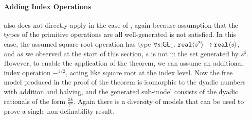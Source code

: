 \paragraph{Adding Index Operations}  also
does not directly apply in the case of ,
again because assumption that the types of the primitive operations
are all well-generated is not satisfied. In this case, the assumed
square root operation has type $\forall
s\mathord:\mathsf{GL}_1.~\textup{\texttt{real}}\langle s^2 \rangle \to \textup{\texttt{real}}\langle s \rangle$, and as
we observed at the start of this section, $s$ is not in the set
generated by $s^2$. However, to enable the application of the theorem,
we can assume an additional index operation $-^{1/2}$, acting like
square root at the index level. Now the free model produced in the
proof of the theorem is isomorphic to the dyadic numbers with addition
and halving, and the generated sub-model consists of the dyadic
rationals of the form $\frac{3k}{2^n}$. Again there is a diversity of
models that can be used to prove a single non-definability result.

